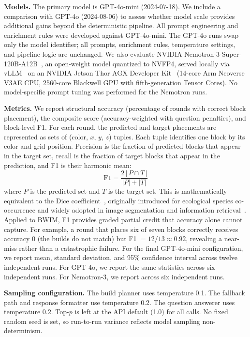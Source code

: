 \documentclass{article}
\begin{document}
\textbf{Models.} The primary model is GPT-4o-mini (2024-07-18). We include
a comparison with GPT-4o (2024-08-06) to assess whether model scale
provides additional gains beyond the deterministic pipeline. All prompt
engineering and enrichment rules were developed against GPT-4o-mini.
The GPT-4o runs swap only the model identifier; all prompts,
enrichment rules, temperature settings, and pipeline logic are unchanged.
We also evaluate NVIDIA Nemotron-3-Super-120B-A12B~\cite{nemotron2024},
an open-weight model quantized to NVFP4, served locally via
vLLM~\cite{vllm2023} on an NVIDIA Jetson Thor AGX Developer
Kit~\cite{jetsonthor} (14-core Arm Neoverse V3AE CPU, 2560-core Blackwell
GPU with fifth-generation Tensor Cores). No model-specific prompt tuning
was performed for the Nemotron runs.

\textbf{Metrics.} We report structural accuracy (percentage of rounds with
correct block placement), the composite score (accuracy-weighted with
question penalties), and block-level F1. For each round, the predicted
and target placements are represented as sets of (color, $x$, $y$, $z$)
tuples. Each tuple identifies one block by its color and grid position.
Precision is the fraction of predicted blocks that appear in the target
set, recall is the fraction of target blocks that appear in the
prediction, and F1 is their harmonic mean:
%
\[
  \mathrm{F1} = \frac{2 \,|\, P \cap T \,|}{|P| + |T|}
\]
%
where $P$ is the predicted set and $T$ is the target set. This is
mathematically equivalent to the Dice coefficient~\cite{dice1945},
originally introduced for ecological species co-occurrence and widely
adopted in image segmentation and information
retrieval~\cite{vanrijsbergen1979}. Applied to BWIM, F1 provides
graded partial credit that accuracy alone cannot capture. For example,
a round that places six of seven blocks correctly receives accuracy 0 (the
builds do not match) but F1 $= 12/13 \approx 0.92$, revealing a
near-miss rather than a catastrophic failure.
For the final GPT-4o-mini configuration, we report
mean, standard deviation, and 95\% confidence interval across twelve
independent runs. For GPT-4o, we report the same statistics across six
independent runs. For Nemotron-3, we report across six independent runs.

\textbf{Sampling configuration.} The build planner uses temperature 0.1.
The fallback path and response formatter use temperature 0.2. The question
answerer uses temperature 0.2. Top-$p$ is left at the API default (1.0)
for all calls. No fixed random seed is set, so run-to-run variance
reflects model sampling non-determinism.
\end{document}
